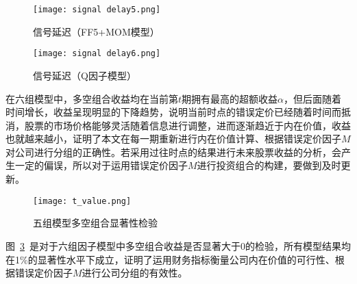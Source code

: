 \begin{figure}[htbp]
  \centering
    \texttt{[image: signal delay5.png]}
    \caption{信号延迟（FF5+MOM模型）}
    \label{signal5}
\end{figure}
  
\begin{figure}[htbp]
  \centering
    \texttt{[image: signal delay6.png]}
    \caption{信号延迟（Q因子模型）}
    \label{signal6}
\end{figure}

在六组模型中，多空组合收益均在当前第$t$期拥有最高的超额收益$\alpha$，但后面随着时间增长，收益呈现明显的下降趋势，说明当前时点的错误定价已经随着时间而抵消，股票的市场价格能够灵活随着信息进行调整，进而逐渐趋近于内在价值，收益也就越来越小，证明了本文在每一期重新进行内在价值计算、根据错误定价因子$M$对公司进行分组的正确性。若采用过往时点的结果进行未来股票收益的分析，会产生一定的偏误，所以对于运用错误定价因子$M$进行投资组合的构建，要做到及时更新。

\begin{figure}[htbp]
  \centering
    \texttt{[image: t\_value.png]}
      \caption{五组模型多空组合显著性检验}
    \label{t}
\end{figure}

图~\ref{t}~是对于六组因子模型中多空组合收益是否显著大于0的检验，所有模型结果均在1\%的显著性水平下成立，证明了运用财务指标衡量公司内在价值的可行性、根据错误定价因子$M$进行公司分组的有效性。


